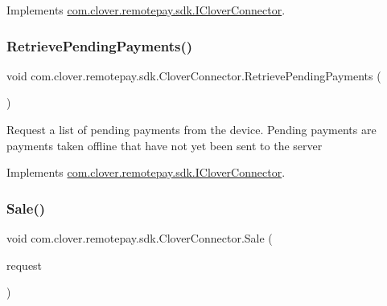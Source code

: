 Implements \hyperlink{interfacecom_1_1clover_1_1remotepay_1_1sdk_1_1_i_clover_connector_a3b85cfdb92b7c64d9b27decc49ca8b7c}{com.\+clover.\+remotepay.\+sdk.\+I\+Clover\+Connector}.

\mbox{\label{classcom_1_1clover_1_1remotepay_1_1sdk_1_1_clover_connector_a8ba5ef9b937ad8edc9cd5052826da2ed}} 
\subsubsection{\texorpdfstring{Retrieve\+Pending\+Payments()}{RetrievePendingPayments()}}
{\footnotesize\ttfamily void com.\+clover.\+remotepay.\+sdk.\+Clover\+Connector.\+Retrieve\+Pending\+Payments (\begin{DoxyParamCaption}{ }\end{DoxyParamCaption})}



Request a list of pending payments from the device. Pending payments are payments taken offline that have not yet been sent to the server 



Implements \hyperlink{interfacecom_1_1clover_1_1remotepay_1_1sdk_1_1_i_clover_connector_a5d371f91336d4950e32ff051061ad91d}{com.\+clover.\+remotepay.\+sdk.\+I\+Clover\+Connector}.

\mbox{\label{classcom_1_1clover_1_1remotepay_1_1sdk_1_1_clover_connector_a1adbcc8a0d4aaa82157a102af4f16b91}} 
\subsubsection{\texorpdfstring{Sale()}{Sale()}}
{\footnotesize\ttfamily void com.\+clover.\+remotepay.\+sdk.\+Clover\+Connector.\+Sale (\begin{DoxyParamCaption}\item[{\hyperlink{classcom_1_1clover_1_1remotepay_1_1sdk_1_1_sale_request}{Sale\+Request}}]{request }\end{DoxyParamCaption})}



